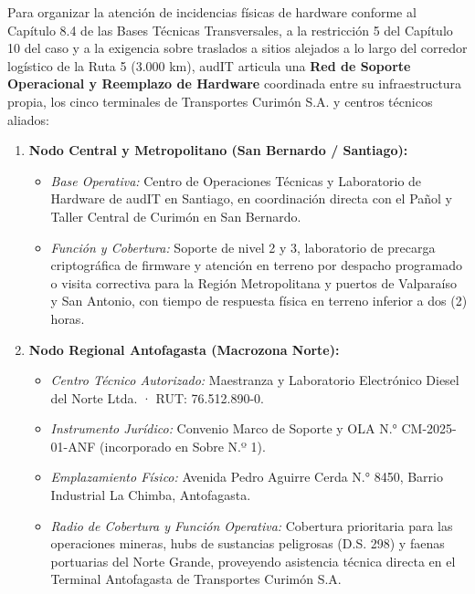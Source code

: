 Para organizar la atención de incidencias físicas de hardware conforme al Capítulo 8.4 de las Bases Técnicas Transversales, a la restricción 5 del Capítulo 10 del caso y a la exigencia  sobre traslados a sitios alejados a lo largo del corredor logístico de la Ruta 5 (3.000 km), audIT articula una \textbf{Red de Soporte Operacional y Reemplazo de Hardware} coordinada entre su infraestructura propia, los cinco terminales de Transportes Curimón S.A. y centros técnicos aliados:

\begin{enumerate}
  \item \textbf{Nodo Central y Metropolitano (San Bernardo / Santiago):}
  \begin{itemize}
    \item \textit{Base Operativa:} Centro de Operaciones Técnicas y Laboratorio de Hardware de audIT en Santiago, en coordinación directa con el Pañol y Taller Central de Curimón en San Bernardo.
    \item \textit{Función y Cobertura:} Soporte de nivel 2 y 3, laboratorio de precarga criptográfica de firmware y atención en terreno por despacho programado o visita correctiva para la Región Metropolitana y puertos de Valparaíso y San Antonio, con tiempo de respuesta física en terreno inferior a dos (2) horas.
  \end{itemize}

  \item \textbf{Nodo Regional Antofagasta (Macrozona Norte):}
  \begin{itemize}
    \item \textit{Centro Técnico Autorizado:} Maestranza y Laboratorio Electrónico Diesel del Norte Ltda. · RUT: 76.512.890-0.
    \item \textit{Instrumento Jurídico:} Convenio Marco de Soporte y OLA N.° CM-2025-01-ANF (incorporado en Sobre N.º 1).
    \item \textit{Emplazamiento Físico:} Avenida Pedro Aguirre Cerda N.° 8450, Barrio Industrial La Chimba, Antofagasta.
    \item \textit{Radio de Cobertura y Función Operativa:} Cobertura prioritaria para las operaciones mineras, hubs de sustancias peligrosas (D.S. 298) y faenas portuarias del Norte Grande, proveyendo asistencia técnica directa en el Terminal Antofagasta de Transportes Curimón S.A.
  \end{itemize}


\end{enumerate}
